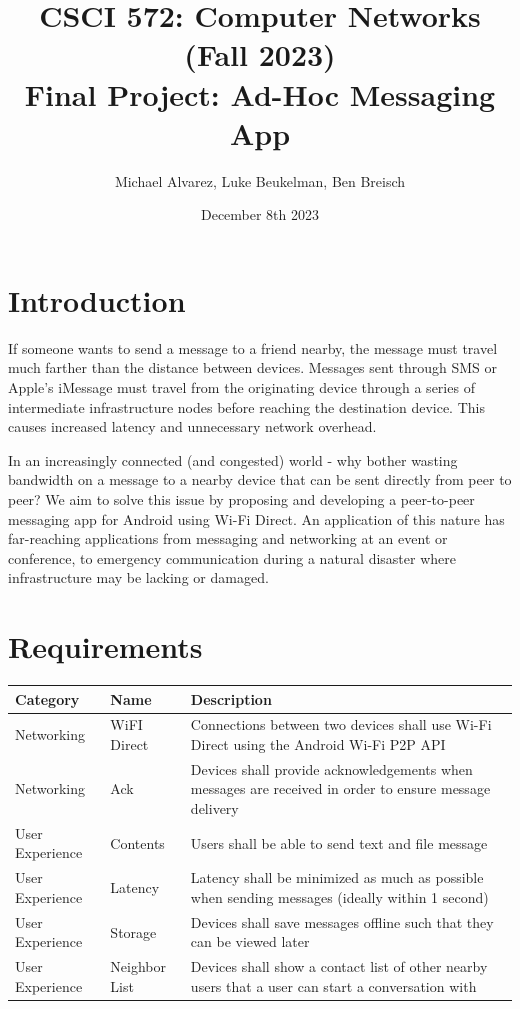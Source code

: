 \documentclass[10pt]{article}
\title{{\normalsize CSCI 572: Computer Networks (Fall 2023)}\\Final Project: Ad-Hoc Messaging App}
\author{Michael Alvarez, Luke Beukelman, Ben Breisch}
\date{December 8th 2023}
\begin{document}
\maketitle

\section{Introduction}

If someone wants to send a message to a friend nearby, the message must travel much farther than the distance between devices. Messages sent through SMS or Apple's iMessage must travel from the originating device through a series of intermediate infrastructure nodes before reaching the destination device. This causes increased latency and unnecessary network overhead.

In an increasingly connected (and congested) world - why bother wasting bandwidth on a message to a nearby device that can be sent directly from peer to peer? We aim to solve this issue by proposing and developing a peer-to-peer messaging app for Android using Wi-Fi Direct. An application of this nature has far-reaching applications from messaging and networking at an event or conference, to emergency communication during a natural disaster where infrastructure may be lacking or damaged. 

\section{Requirements}

\begin{center}
    \begin{tabular}{| p{} | p{} | p{} |}
        \hline
        Category        & Name          & Description
        \\ \hline
        Networking      & WiFI Direct   & Connections between two devices shall use Wi-Fi Direct using the Android Wi-Fi P2P API
        \\ \hline
        Networking      & Ack           & Devices shall provide acknowledgements when messages are received in order to ensure message delivery
        \\ \hline
        User Experience & Contents      & Users shall be able to send text and file message
        \\ \hline
        User Experience & Latency       & Latency shall be minimized as much as possible when sending messages (ideally within 1 second)
        \\ \hline
        User Experience & Storage       & Devices shall save messages offline such that they can be viewed later
        \\ \hline
        User Experience & Neighbor List & Devices shall show a contact list of other nearby users that a user can start a conversation with
        \\ \hline
    \end{tabular}
\end{center}
\end{document}
